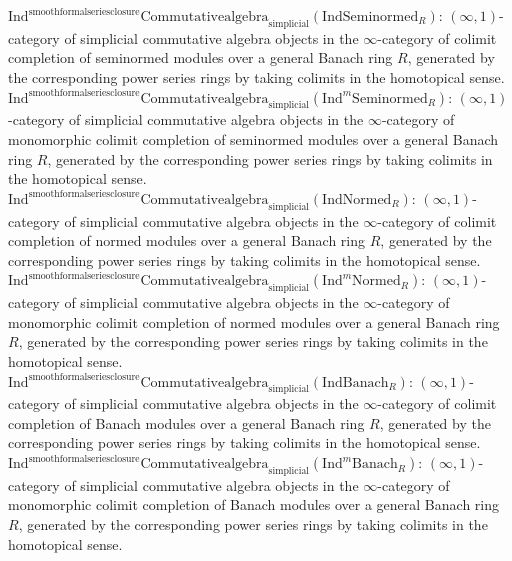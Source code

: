 \documentclass[11pt]{book}
\theoremstyle{definition}
\numberwithin{equation}{section}
\begin{document}
\noindent $\mathrm{Ind}^\text{smoothformalseriesclosure}\mathrm{Commutativealgebra}_{\mathrm{simplicial}}(\mathrm{Ind}\mathrm{Seminormed}_R)$: $(\infty,1)$-category of simplicial commutative algebra objects in the $\infty$-category of colimit completion of seminormed modules over a general Banach ring $R$, generated by the corresponding power series rings by taking colimits in the homotopical sense. \\ 
\noindent $\mathrm{Ind}^\text{smoothformalseriesclosure}\mathrm{Commutativealgebra}_{\mathrm{simplicial}}(\mathrm{Ind}^m\mathrm{Seminormed}_R)$: $(\infty,1)$-category of simplicial commutative algebra objects in the $\infty$-category of monomorphic colimit completion of seminormed modules over a general Banach ring $R$, generated by the corresponding power series rings by taking colimits in the homotopical sense. \\ 
\noindent $\mathrm{Ind}^\text{smoothformalseriesclosure}\mathrm{Commutativealgebra}_{\mathrm{simplicial}}(\mathrm{Ind}\mathrm{Normed}_R)$: $(\infty,1)$-category of simplicial commutative algebra objects in the $\infty$-category of colimit completion of normed modules over a general Banach ring $R$, generated by the corresponding power series rings by taking colimits in the homotopical sense. \\ 
\noindent $\mathrm{Ind}^\text{smoothformalseriesclosure}\mathrm{Commutativealgebra}_{\mathrm{simplicial}}(\mathrm{Ind}^m\mathrm{Normed}_R)$: $(\infty,1)$-category of simplicial commutative algebra objects in the $\infty$-category of monomorphic colimit completion of normed modules over a general Banach ring $R$, generated by the corresponding power series rings by taking colimits in the homotopical sense. \\ 
\noindent $\mathrm{Ind}^\text{smoothformalseriesclosure}\mathrm{Commutativealgebra}_{\mathrm{simplicial}}(\mathrm{Ind}\mathrm{Banach}_R)$: $(\infty,1)$-category of simplicial commutative algebra objects in the $\infty$-category of colimit completion of Banach modules over a general Banach ring $R$, generated by the corresponding power series rings by taking colimits in the homotopical sense. \\ 
\noindent $\mathrm{Ind}^\text{smoothformalseriesclosure}\mathrm{Commutativealgebra}_{\mathrm{simplicial}}(\mathrm{Ind}^m\mathrm{Banach}_R)$: $(\infty,1)$-category of simplicial commutative algebra objects in the $\infty$-category of monomorphic colimit completion of Banach modules over a general Banach ring $R$, generated by the corresponding power series rings by taking colimits in the homotopical sense. \\ 
\end{document}
